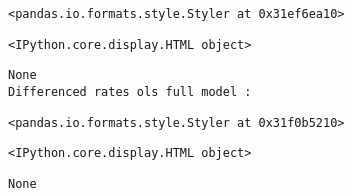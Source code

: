 \documentclass[11pt]{article}
\begin{document}
    
    \begin{Verbatim}[commandchars=\\\{\}]
<pandas.io.formats.style.Styler at 0x31ef6ea10>
    \end{Verbatim}

    
    
    \begin{Verbatim}[commandchars=\\\{\}]
<IPython.core.display.HTML object>
    \end{Verbatim}

    
    \begin{Verbatim}[commandchars=\\\{\}]
None
Differenced rates ols full model :
    \end{Verbatim}

    
    \begin{Verbatim}[commandchars=\\\{\}]
<pandas.io.formats.style.Styler at 0x31f0b5210>
    \end{Verbatim}

    
    
    \begin{Verbatim}[commandchars=\\\{\}]
<IPython.core.display.HTML object>
    \end{Verbatim}

    
    \begin{Verbatim}[commandchars=\\\{\}]
None
    \end{Verbatim}
\end{document}
